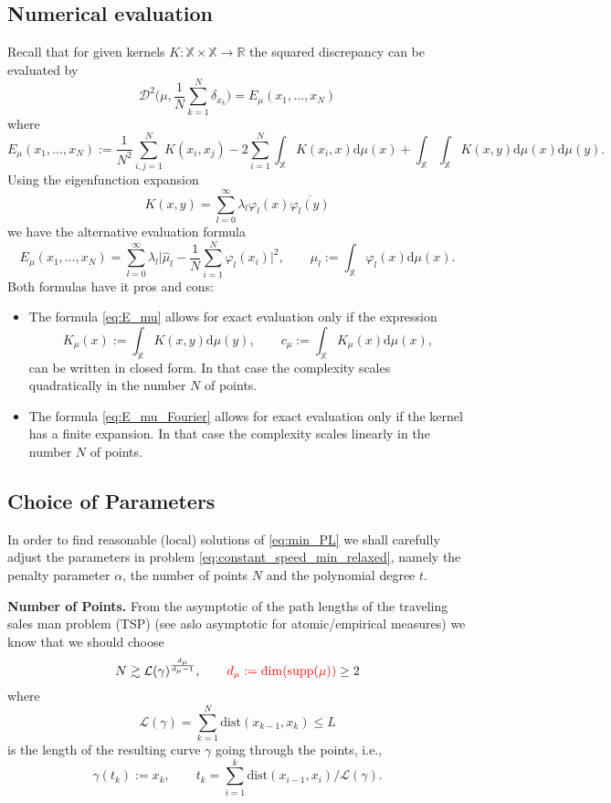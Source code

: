 \documentclass[draft,
a4paper,11pt,DIV=11,%
abstract=on%
]{scrartcl}
\begin{document}
\subsection{Numerical evaluation}
Recall that for given kernels $K:\mathbb X\times \mathbb X \to \mathbb R$ the squared discrepancy can be evaluated by
\[
  \mathscr D^{2}\Big(\mu, \frac 1N \sum_{k=1}^{N} \delta_{x_{k}}\Big) = E_{\mu}(x_{1},\dots,x_{N})
\]
where
\begin{equation}
  \label{eq:E_mu}
  E_{\mu}(x_{1},\dots,x_{N}) :=
    \frac{1}{N^{2}}\sum_{i,j=1}^{N} K(x_{i},x_{j}) - 2\sum_{i=1}^{N} \int_{\mathbb X} K(x_{i},x) \mathrm d\mu(x) + \int_{\mathbb X}\int_{\mathbb X} K(x,y) \mathrm d\mu(x) \mathrm d\mu(y).
  \end{equation}
Using the eigenfunction expansion
\[
 K(x,y) = \sum_{l=0}^{\infty} \lambda_{l} \varphi_{l}(x) \overline{\varphi_{l}(y)} 
\]
we have the alternative evaluation formula
\begin{equation}
  \label{eq:E_mu_Fourier}
  E_{\mu}(x_{1},\dots,x_{N}) = \sum_{l=0}^{\infty} \lambda_{l} \Big| \hat\mu_{l}
  - \frac 1N \sum_{i=1}^{N} \varphi_{l}(x_{i}) \Big|^{2}, \quad\quad \mu_{l} := \int_{\mathbb X} \varphi_{l}(x) \mathrm d\mu(x).
\end{equation}
Both formulas have it pros and cons:
\begin{itemize}
\item The formula \eqref{eq:E_mu} allows for exact evaluation only if the expression
\[
  K_{\mu}(x) := \int_{\mathbb X} K(x,y) \mathrm d\mu(y), \qquad  c_{\mu} := \int_{\mathbb X} K_{\mu}(x) \mathrm d\mu(x),
\]
can be written in closed form. In that case the complexity scales quadratically in the number $N$ of points.

\item The formula \eqref{eq:E_mu_Fourier} allows for exact evaluation only if the kernel has a finite expansion. In that case the complexity scales linearly in the number $N$ of points. 
\end{itemize}
\subsection{Choice of Parameters}

In order to find reasonable (local) solutions of \eqref{eq:min_PL} we shall carefully adjust the parameters in problem \eqref{eq:constant_speed_min_relaxed}, namely the penalty parameter $\alpha$, the number of points $N$ and the polynomial degree $t$.

\textbf{Number of Points.}
From the asymptotic of the path lengths of the traveling sales man problem (TSP) {\color{blue}(see aslo asymptotic for atomic/empirical measures)}
we know that we should choose
\[
  N \gtrsim \mathcal L(\gamma)^{\frac{d_{\mu}}{d_{\mu}-1}}, \qquad  {\color{red} d_{\mu} := \mathrm{dim}(\mathrm{supp}(\mu))} \ge 2
\]
where
\[
  \mathcal L(\gamma) = \sum_{k=1}^{N} \mathrm{dist}(x_{k-1},x_{k}) \le L
\]
is the length of the resulting curve $\gamma$ going through the points, i.e.,
\[
 \gamma(t_{k}) := x_{k}, \qquad t_{k} = \sum_{i=1}^{k}  \mathrm{dist}(x_{i-1},x_{i})/ \mathcal L(\gamma).
\]
\end{document}
